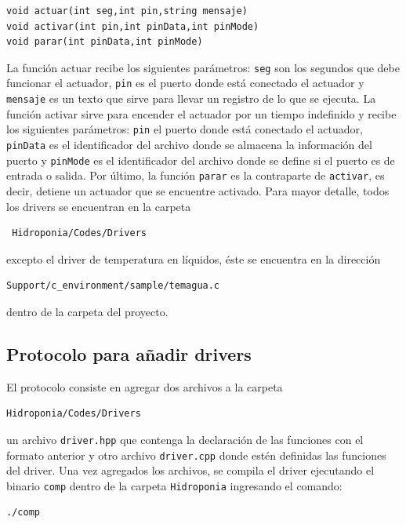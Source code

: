 \documentclass[10pt,twocolumn]{article}
\begin{document}
\begin{verbatim}
void actuar(int seg,int pin,string mensaje)
void activar(int pin,int pinData,int pinMode)
void parar(int pinData,int pinMode)
\end{verbatim}

La funci\'on actuar recibe los siguientes par\'ametros: \verb|seg| son los segundos que debe funcionar el actuador, \verb|pin| es el puerto donde est\'a conectado el 
actuador y \verb|mensaje| es un texto que sirve para llevar un registro de lo que se ejecuta. La funci\'on activar sirve 
para encender el actuador por un tiempo indefinido y recibe los siguientes par\'ametros: \verb|pin| el puerto donde est\'a conectado el actuador, 
\verb|pinData| es el identificador del archivo donde se almacena la informaci\'on del puerto y \verb|pinMode| es el identificador del archivo donde se define si el puerto 
es de entrada o salida. Por \'ultimo, la funci\'on \verb|parar| es la contraparte de \verb|activar|, es decir, detiene un actuador que se encuentre activado. Para mayor 
detalle, todos los drivers se encuentran 
en 
la carpeta
\begin{verbatim}
 Hidroponia/Codes/Drivers
\end{verbatim}

excepto el driver de temperatura en l\'iquidos, \'este se encuentra en la 
direcci\'on

\begin{verbatim}
Support/c_environment/sample/temagua.c
\end{verbatim}

dentro de la carpeta del proyecto.

\subsection{Protocolo para a\~nadir drivers}
El protocolo consiste en agregar dos archivos a la carpeta

\begin{verbatim}
Hidroponia/Codes/Drivers
\end{verbatim}

un archivo \verb|driver.hpp| que contenga la declaraci\'on de las funciones con el formato anterior y otro archivo \verb|driver.cpp| donde est\'en definidas las funciones 
del driver. Una vez agregados los archivos, se compila el driver ejecutando el binario \verb|comp| dentro de la carpeta \verb|Hidroponia| ingresando el comando:

\begin{verbatim}
./comp
\end{verbatim}
\end{document}
